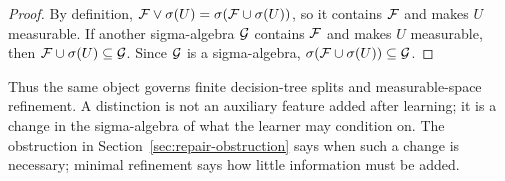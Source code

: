 \begin{proof}
By definition, $\mathcal{F}\vee\sigma(U)=\sigma(\mathcal{F}\cup\sigma(U))$, so it contains $\mathcal{F}$ and makes $U$ measurable. If another sigma-algebra $\mathcal{G}$ contains $\mathcal{F}$ and makes $U$ measurable, then $\mathcal{F}\cup\sigma(U)\subseteq\mathcal{G}$. Since $\mathcal{G}$ is a sigma-algebra, $\sigma(\mathcal{F}\cup\sigma(U))\subseteq\mathcal{G}$.
\end{proof}

Thus the same object governs finite decision-tree splits and measurable-space refinement. A distinction is not an auxiliary feature added after learning; it is a change in the sigma-algebra of what the learner may condition on. The obstruction in Section~\ref{sec:repair-obstruction} says when such a change is necessary; minimal refinement says how little information must be added.
